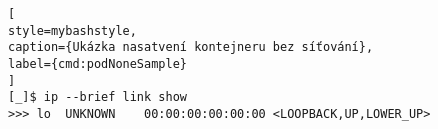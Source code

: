 \begin{lstfloat}
\begin{lstlisting}[
style=mybashstyle,
caption={Ukázka nasatvení kontejneru bez síťování},
label={cmd:podNoneSample}
]
[_]$ ip --brief link show
>>> lo  UNKNOWN    00:00:00:00:00:00 <LOOPBACK,UP,LOWER_UP>
\end{lstlisting}
\end{lstfloat}